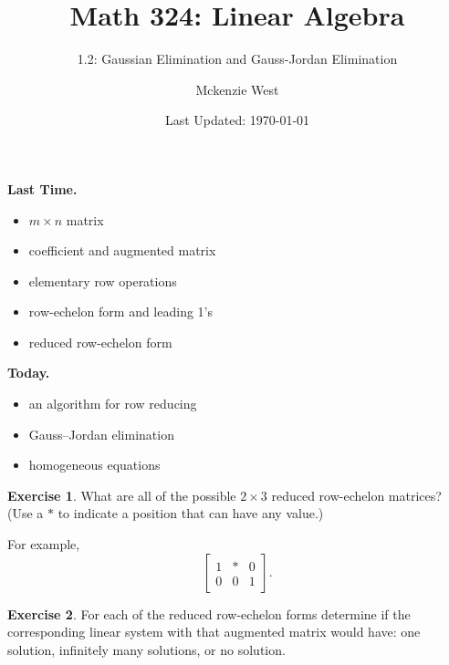 \documentclass{beamer}
\theoremstyle{definition}
\newtheorem{exercise}{Exercise}
\begin{document}
	\title{Math 324: Linear Algebra}
	\subtitle{1.2: Gaussian Elimination and Gauss-Jordan Elimination}
	\author{Mckenzie West}
	\date{Last Updated: \today}
\begin{frame}
\maketitle
\end{frame}

\begin{frame}{\insertframenumber}
	\begin{block}{\textbf{Last Time.}}
	\begin{itemize}[label=--]
		\item $m\times n$ matrix
		\item coefficient and augmented matrix
		\item elementary row operations
		\item row-echelon form and leading 1's
		\item reduced row-echelon form
	\end{itemize}
	\end{block}
\begin{block}{\textbf{Today.}}
\begin{itemize}[label=--]
	\item an algorithm for row reducing
	\item Gauss--Jordan elimination
	\item homogeneous equations
\end{itemize}
\end{block}
\end{frame}

\begin{frame}{\insertframenumber}
\begin{exercise}
	What are all of the possible $2\times 3$ reduced row-echelon matrices? (Use a $*$ to indicate a position that can have any value.) 
	
	For example, 
		\[\begin{bmatrix}1&*&0\\0&0&1\end{bmatrix}.\]
\end{exercise}
\begin{exercise}
	For each of the reduced row-echelon forms determine if the corresponding linear system with that augmented matrix would have: one solution, infinitely many solutions, or no solution.
\end{exercise}
\end{frame}
\end{document}
